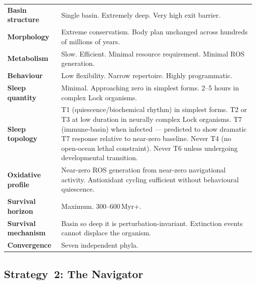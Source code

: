 \documentclass[10pt, a4paper]{article}
\begin{document}
\begin{mdframed}[
  backgroundcolor=lockbox,
  linecolor=headergreen,
  linewidth=0.8pt,
  innertopmargin=0.5em,
  innerbottommargin=0.5em,
  innerleftmargin=0.8em,
  innerrightmargin=0.8em
]
\small
\begin{tabular}{p{3.0cm}p{9.5cm}}
\textbf{Basin structure} &
Single basin. Extremely deep.
Very high exit barrier.\\[0.2em]
\textbf{Morphology} &
Extreme conservatism. Body plan
unchanged across hundreds of millions
of years.\\[0.2em]
\textbf{Metabolism} &
Slow. Efficient. Minimal resource
requirement. Minimal ROS generation.\\[0.2em]
\textbf{Behaviour} &
Low flexibility. Narrow repertoire.
Highly programmatic.\\[0.2em]
\textbf{Sleep quantity} &
Minimal. Approaching zero in simplest
forms. 2--5 hours in complex Lock
organisms.\\[0.2em]
\textbf{Sleep topology} &
T1 (quiescence/biochemical rhythm) in
simplest forms. T2 or T3 at low duration
in neurally complex Lock organisms.
T7 (immune-basin) when infected ---
predicted to show dramatic T7 response
relative to near-zero baseline.
Never T4 (no open-ocean lethal
constraint). Never T6 unless undergoing
developmental transition.\\[0.2em]
\textbf{Oxidative profile} &
Near-zero ROS generation from near-zero
navigational activity. Antioxidant cycling
sufficient without behavioural quiescence.\\[0.2em]
\textbf{Survival horizon} &
Maximum. 300--600\,Myr+.\\[0.2em]
\textbf{Survival mechanism} &
Basin so deep it is perturbation-invariant.
Extinction events cannot displace the
organism.\\[0.2em]
\textbf{Convergence} &
Seven independent phyla.\\
\end{tabular}
\end{mdframed}

\subsection{Strategy~2: The Navigator}
\end{document}

